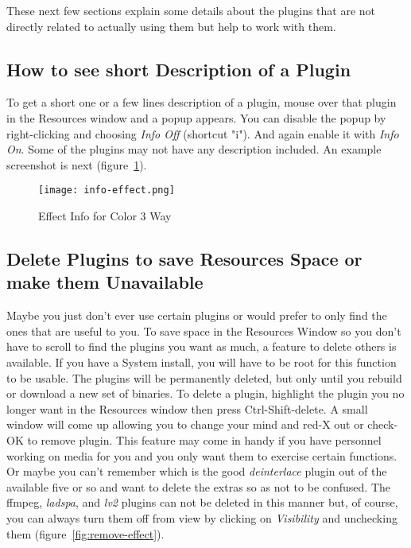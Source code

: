 These next few sections explain some details about the plugins that are not directly related to actually using them but help to work with them.

\subsection{How to see short Description of a Plugin}%
\label{sub:short_description_plugin}

To get a short one or a few lines description of a plugin, mouse over that plugin in the Resources window and a popup appears. You can disable the popup by right-clicking and choosing \textit{Info Off} (shortcut "i"). And again enable it with \textit{Info On}. Some of the plugins may not have any description included. An example screenshot is next (figure~\ref{fig:info-effect}).

\begin{figure}[htpb]
    \centering
    \texttt{[image: info-effect.png]}
    \caption{Effect Info for Color 3 Way}
    \label{fig:info-effect}
\end{figure}

\subsection{Delete Plugins to save Resources Space or make them Unavailable}%
\label{sub:delete_plugin_resouces_unavaible}

Maybe you just don't ever use certain plugins or would prefer to only find the ones that are useful to you. To save space in the Resources Window so you don't have to scroll to find the plugins you want as much, a feature to delete others is available. If you have a System install, you will have to be root for this function to be usable. The plugins will be permanently deleted, but only until you rebuild or download a new set of \CGG{} binaries. To delete a plugin, highlight the plugin you no longer want in the Resources window then press Ctrl-Shift-delete. A small window will come up allowing you to change your mind and red-X out or check-OK to remove plugin. This feature may come in handy if you have personnel working on media for you and you only want them to exercise certain functions. Or maybe you can't remember which is the good \textit{deinterlace} plugin out of the available five or so and want to delete the extras so as not to be confused. The ffmpeg, \textit{ladspa}, and \textit{lv2} plugins can not be deleted in this manner but, of course, you can always turn them off from view by clicking on \textit{Visibility} and unchecking them (figure~\ref{fig:remove-effect}).

